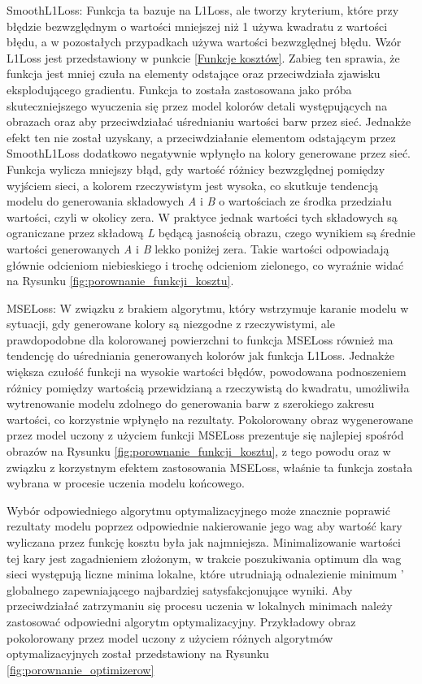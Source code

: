   \noindent
  SmoothL1Loss: Funkcja ta bazuje na L1Loss, ale tworzy kryterium, które przy
  błędzie bezwzględnym o wartości mniejszej niż 1 używa kwadratu z wartości
  błędu, a w pozostałych przypadkach używa wartości bezwzględnej błędu. Wzór
  L1Loss jest przedstawiony w punkcie \ref{Funkcje kosztów}. Zabieg ten sprawia,
  że funkcja jest mniej czuła na elementy odstające oraz przeciwdziała zjawisku
  eksplodującego gradientu. Funkcja to została zastosowana jako próba skuteczniejszego
  wyuczenia się przez model kolorów detali występujących na obrazach oraz aby przeciwdziałać
  uśrednianiu wartości barw przez sieć. Jednakże efekt ten nie został uzyskany,
  a przeciwdziałanie elementom odstającym przez SmoothL1Loss dodatkowo negatywnie wpłynęło na
  kolory generowane przez sieć. Funkcja wylicza mniejszy błąd, gdy
  wartość różnicy bezwzględnej pomiędzy wyjściem sieci, a kolorem
  rzeczywistym jest wysoka, co skutkuje tendencją modelu do
  generowania składowych \textit{A} i \textit{B} o wartościach ze środka
  przedziału wartości, czyli w okolicy zera. W praktyce jednak wartości tych
  składowych są ograniczane przez składową \textit{L} będącą jasnością obrazu,
  czego wynikiem są średnie wartości generowanych \textit{A} i \textit{B} lekko poniżej zera.
  Takie wartości odpowiadają głównie odcieniom niebieskiego i trochę odcieniom
  zielonego, co wyraźnie widać na Rysunku \ref{fig:porownanie_funkcji_kosztu}.

  \noindent
  MSELoss: W związku z brakiem algorytmu, który wstrzymuje karanie modelu w
  sytuacji, gdy generowane kolory są niezgodne z rzeczywistymi, ale prawdopodobne
  dla kolorowanej powierzchni to funkcja MSELoss również ma tendencję do
  uśredniania generowanych kolorów jak funkcja L1Loss. Jednakże większa czułość funkcji
  na wysokie wartości błędów, powodowana podnoszeniem różnicy pomiędzy wartością
  przewidzianą a rzeczywistą do kwadratu,
  umożliwiła wytrenowanie modelu zdolnego do generowania
  barw z szerokiego zakresu wartości, co korzystnie wpłynęło na rezultaty.
  Pokolorowany obraz wygenerowane przez model uczony z użyciem funkcji MSELoss prezentuje
  się najlepiej spośród obrazów na Rysunku \ref{fig:porownanie_funkcji_kosztu},
  z tego powodu oraz w związku z korzystnym efektem zastosowania MSELoss, właśnie
  ta funkcja została wybrana w procesie uczenia modelu końcowego.

  Wybór odpowiedniego algorytmu optymalizacyjnego może znacznie poprawić rezultaty
  modelu poprzez odpowiednie nakierowanie jego wag aby wartość kary wyliczana
  przez funkcję kosztu była jak najmniejsza. Minimalizowanie wartości tej kary
  jest zagadnieniem złożonym, w trakcie poszukiwania optimum dla wag sieci
  występują liczne minima lokalne, które utrudniają odnalezienie minimum '
  globalnego zapewniającego najbardziej satysfakcjonujące wyniki. Aby
  przeciwdziałać zatrzymaniu się procesu uczenia w lokalnych minimach należy
  zastosować odpowiedni algorytm optymalizacyjny. Przykładowy obraz pokolorowany
  przez model uczony z użyciem różnych algorytmów optymalizacyjnych został
  przedstawiony na Rysunku \ref{fig:porownanie_optimizerow}

